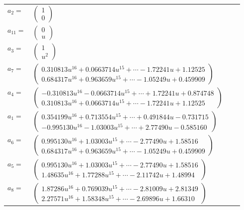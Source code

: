 \documentclass[1p]{elsarticle_modified}
\theoremstyle{definition}
\begin{document}
\begin{tabular}{m{7pt} m{180pt} m{7pt} m{180pt} }
\flushright $a_{2}=$&$\begin{pmatrix}1\\0\end{pmatrix}$ \\
\flushright $a_{11}=$&$\begin{pmatrix}0\\u\end{pmatrix}$ \\
\flushright $a_{3}=$&$\begin{pmatrix}1\\u^2\end{pmatrix}$ \\
\flushright $a_{7}=$&$\begin{pmatrix}0.310813 u^{16}+0.0663714 u^{15}+\cdots-1.72241 u+1.12525\\0.684317 u^{16}+0.963659 u^{15}+\cdots-1.05249 u+0.459909\end{pmatrix}$ \\
\flushright $a_{4}=$&$\begin{pmatrix}-0.310813 u^{16}-0.0663714 u^{15}+\cdots+1.72241 u+0.874748\\0.310813 u^{16}+0.0663714 u^{15}+\cdots-1.72241 u+1.12525\end{pmatrix}$ \\
\flushright $a_{1}=$&$\begin{pmatrix}0.354199 u^{16}+0.713554 u^{15}+\cdots+0.491844 u-0.731715\\-0.995130 u^{16}-1.03003 u^{15}+\cdots+2.77490 u-0.585160\end{pmatrix}$ \\
\flushright $a_{6}=$&$\begin{pmatrix}0.995130 u^{16}+1.03003 u^{15}+\cdots-2.77490 u+1.58516\\0.684317 u^{16}+0.963659 u^{15}+\cdots-1.05249 u+0.459909\end{pmatrix}$ \\
\flushright $a_{5}=$&$\begin{pmatrix}0.995130 u^{16}+1.03003 u^{15}+\cdots-2.77490 u+1.58516\\1.48635 u^{16}+1.77288 u^{15}+\cdots-2.11742 u+1.48994\end{pmatrix}$ \\
\flushright $a_{8}=$&$\begin{pmatrix}1.87286 u^{16}+0.769039 u^{15}+\cdots-2.81009 u+2.81349\\2.27571 u^{16}+1.58348 u^{15}+\cdots-2.69896 u+1.66310\end{pmatrix}$ \\

\end{tabular}
\end{document}
